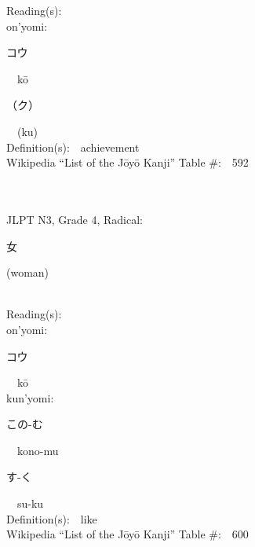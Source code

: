 \begin{multicols}{2}
Reading(s):\ \ \\
{\hspace*{1em}}on'yomi:\ \ \\
{\hspace*{2em}}{\begin{CJK}{UTF8}{min} コウ \end{CJK}}\ \ k\=o\ \ \\
{\hspace*{2em}}{\begin{CJK}{UTF8}{min} （ク） \end{CJK}}\ \ (ku)\ \ \\
Definition(s):\ \ achievement \\
Wikipedia ``List of the J\=oy\=o Kanji'' Table \#:\ \ 592 \\
\ \ \\
{\fontsize{34pt}{40pt}  }\ \ \\  %
{JLPT N3, Grade 4, Radical:\ \ {\begin{CJK}{UTF8}{min} 女 \end{CJK}} (woman) } \\
Reading(s):\ \ \\
{\hspace*{1em}}on'yomi:\ \ \\
{\hspace*{2em}}{\begin{CJK}{UTF8}{min} コウ \end{CJK}}\ \ k\=o\ \ \\
{\hspace*{1em}}kun'yomi:\ \ \\
{\hspace*{2em}}{\begin{CJK}{UTF8}{min} この-む \end{CJK}}\ \ kono-mu\ \ \\
{\hspace*{2em}}{\begin{CJK}{UTF8}{min} す-く \end{CJK}}\ \ su-ku\ \ \\
Definition(s):\ \ like \\
Wikipedia ``List of the J\=oy\=o Kanji'' Table \#:\ \ 600 \\
\ \ \\
{\fontsize{34pt}{40pt}  }\ \ \\  %

\end{multicols}
